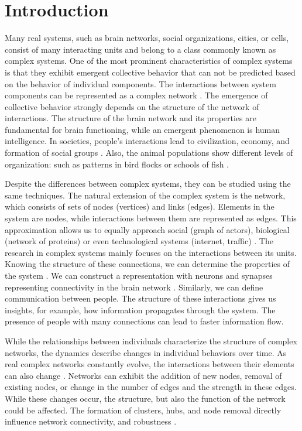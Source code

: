 \chapter{Introduction} %

Many real systems, such as brain networks, social organizations, cities, or cells, consist of many interacting units and belong to a class commonly known as complex systems. One of the most prominent characteristics of complex systems is that they exhibit emergent collective behavior that can not be predicted based on the behavior of individual components. The interactions between system components can be represented as a complex network \cite{kwapien2012}. The emergence of collective behavior strongly depends on the structure of the network of interactions. The structure of the brain network and its properties are fundamental for brain functioning, while an emergent phenomenon is human intelligence. In societies, people's interactions lead to civilization, economy, and formation of social groups \cite{thurner2018}.
Also, the animal populations show different levels of organization: such as patterns in bird flocks or schools of fish \cite{thurner2018}.

Despite the differences between complex systems, they can be studied using the same techniques. The natural extension of the complex system is the network, which consists of sets of nodes (vertices) and links (edges). Elements in the system are nodes, while interactions between them are represented as edges. This approximation allows us to equally approach social \cite{myers2014, sarigol2014} (graph of actors), biological (network of proteins) \cite{fraiman2009ising, schneider2011modeling} or even technological systems (internet, traffic) \cite{costa2007characterization, costa2011analyzing, newman2003structure}. The research in complex systems mainly focuses on the interactions between its units. Knowing the structure of these connections, we can determine the properties of the system \cite{ladyman2013}. We can construct a representation with neurons and synapses representing connectivity in the brain network \cite{latora2017complex}. Similarly, we can define communication between people. The structure of these interactions gives us insights, for example, how information propagates through the system. The presence of people with many connections can lead to faster information flow. 

While the relationships between individuals characterize the structure of complex networks, the dynamics describe changes in individual behaviors over time. As real complex networks constantly evolve, the interactions between their elements can also change \cite{thurner2018}. Networks can exhibit the addition of new nodes, removal of existing nodes, or change in the number of edges and the strength in these edges.
While these changes occur, the structure, but also the function of the network could be affected. The formation of clusters, hubs, and node removal directly influence network connectivity, and robustness \cite{boccaletti2006complex}. 

